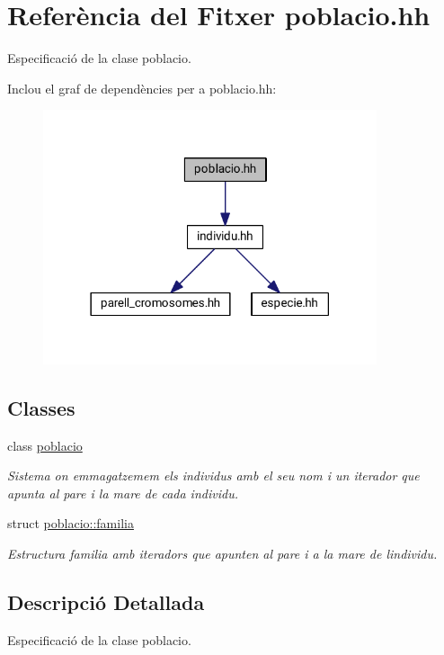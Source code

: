 \hypertarget{poblacio_8hh}{}\section{Referència del Fitxer poblacio.\+hh}
\label{poblacio_8hh}


Especificació de la clase poblacio.  


Inclou el graf de dependències per a poblacio.\+hh\+:
\nopagebreak
\begin{figure}[H]
\begin{center}
\leavevmode
\includegraphics[width=278pt]{poblacio_8hh__incl}
\end{center}
\end{figure}
\subsection*{Classes}
\begin{DoxyCompactItemize}
\item 
class \hyperlink{classpoblacio}{poblacio}
\begin{DoxyCompactList}\small\item\em Sistema on emmagatzemem els individus amb el seu nom i un iterador que apunta al pare i la mare de cada individu. \end{DoxyCompactList}\item 
struct \hyperlink{structpoblacio_1_1familia}{poblacio\+::familia}
\begin{DoxyCompactList}\small\item\em Estructura familia amb iteradors que apunten al pare i a la mare de l\textquotesingle{}individu. \end{DoxyCompactList}\end{DoxyCompactItemize}


\subsection{Descripció Detallada}
Especificació de la clase poblacio. 

